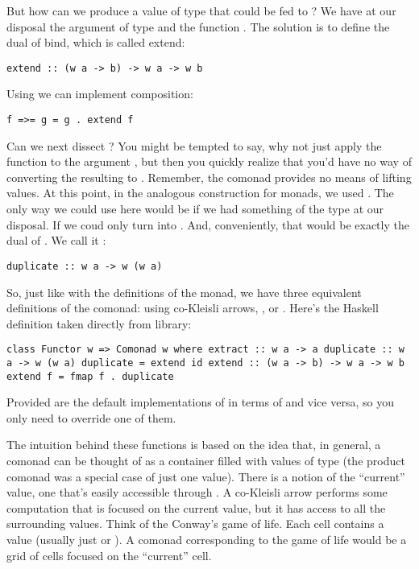 But how can we produce a value of type  that could be fed
to ? We have at our disposal the argument of type
 and the function .
The solution is to define the dual of bind, which is called extend:

\begin{verbatim}
extend :: (w a -> b) -> w a -> w b
\end{verbatim}

Using  we can implement composition:

\begin{verbatim}
f =>= g = g . extend f
\end{verbatim}

Can we next dissect ? You might be tempted to say, why
not just apply the function  to the
argument , but then you quickly realize that you'd have no
way of converting the resulting  to . Remember,
the comonad provides no means of lifting values. At this point, in the
analogous construction for monads, we used . The only way
we could use  here would be if we had something of the type
 at our disposal. If we coud only turn 
into . And, conveniently, that would be exactly the
dual of . We call it :

\begin{verbatim}
duplicate :: w a -> w (w a)
\end{verbatim}

So, just like with the definitions of the monad, we have three
equivalent definitions of the comonad: using co-Kleisli arrows,
, or . Here's the Haskell definition
taken directly from  library:

\begin{verbatim}
class Functor w => Comonad w where extract :: w a -> a duplicate :: w a -> w (w a) duplicate = extend id extend :: (w a -> b) -> w a -> w b extend f = fmap f . duplicate
\end{verbatim}

Provided are the default implementations of  in terms of
 and vice versa, so you only need to override one of
them.

The intuition behind these functions is based on the idea that, in
general, a comonad can be thought of as a container filled with values
of type  (the product comonad was a special case of just one
value). There is a notion of the ``current'' value, one that's easily
accessible through . A co-Kleisli arrow performs some
computation that is focused on the current value, but it has access to
all the surrounding values. Think of the Conway's game of life. Each
cell contains a value (usually just  or ). A
comonad corresponding to the game of life would be a grid of cells
focused on the ``current'' cell.

